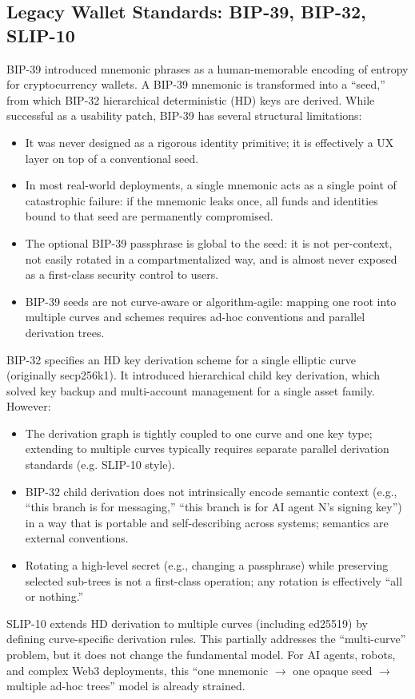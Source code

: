 \documentclass[11pt,a4paper]{article}
\begin{document}
\subsection{Legacy Wallet Standards: BIP-39, BIP-32, SLIP-10}
BIP-39 introduced mnemonic phrases as a human-memorable encoding of entropy for cryptocurrency wallets. A BIP-39 mnemonic is transformed into a ``seed,'' from which BIP-32 hierarchical deterministic (HD) keys are derived. While successful as a usability patch, BIP-39 has several structural limitations:
\begin{itemize}[noitemsep, nolistsep]
    \item It was never designed as a rigorous identity primitive; it is effectively a UX layer on top of a conventional seed.
    \item In most real-world deployments, a single mnemonic acts as a single point of catastrophic failure: if the mnemonic leaks once, all funds and identities bound to that seed are permanently compromised.
    \item The optional BIP-39 passphrase is global to the seed: it is not per-context, not easily rotated in a compartmentalized way, and is almost never exposed as a first-class security control to users.
    \item BIP-39 seeds are not curve-aware or algorithm-agile: mapping one root into multiple curves and schemes requires ad-hoc conventions and parallel derivation trees.
\end{itemize}
BIP-32 specifies an HD key derivation scheme for a single elliptic curve (originally secp256k1). It introduced hierarchical child key derivation, which solved key backup and multi-account management for a single asset family. However:
\begin{itemize}[noitemsep, nolistsep]
    \item The derivation graph is tightly coupled to one curve and one key type; extending to multiple curves typically requires separate parallel derivation standards (e.g. SLIP-10 style).
    \item BIP-32 child derivation does not intrinsically encode semantic context (e.g., ``this branch is for messaging,'' ``this branch is for AI agent N's signing key'') in a way that is portable and self-describing across systems; semantics are external conventions.
    \item Rotating a high-level secret (e.g., changing a passphrase) while preserving selected sub-trees is not a first-class operation; any rotation is effectively ``all or nothing.''
\end{itemize}
SLIP-10 extends HD derivation to multiple curves (including ed25519) by defining curve-specific derivation rules. This partially addresses the ``multi-curve'' problem, but it does not change the fundamental model. For AI agents, robots, and complex Web3 deployments, this ``one mnemonic $\to$ one opaque seed $\to$ multiple ad-hoc trees'' model is already strained.
\end{document}
